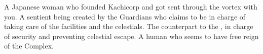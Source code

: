 \documentclass[char]{guardians}
\begin{document}
\begin{contacts}
  \contact{\cKachiko{}} A Japanese woman who founded Kachicorp and got sent through the vortex with you.
   A sentient being created by the Guardians who claims to be in charge of taking care of the facilities and the celestials.
   The counterpart to the \cCaretaker{}, in charge of security and preventing celestial escape.
  \contact{\cJascha{\intro}} A human who seems to have free reign of the Complex.
\end{contacts}
\end{document}
